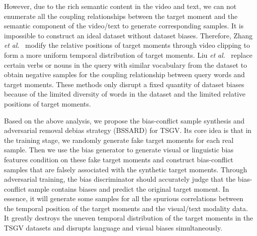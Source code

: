 However, due to the rich semantic content in the video and text, we can not enumerate all the coupling relationships between the target moment and the semantic component of the video/text to generate corresponding samples. It is impossible to construct an ideal dataset without dataset biases. 
Therefore, Zhang {\it et al.}~\cite{RN31} modify the relative positions of target moments through video clipping to form a more uniform temporal distribution of target moments. 
Liu {\it et al.}~\cite{RN28} replace certain verbs or nouns in the query with similar vocabulary from the dataset to obtain negative samples for the coupling relationship between query words and target moments. 
These methods only disrupt a fixed quantity of dataset biases because of the limited diversity of words in the dataset and the limited relative positions of target moments. 

Based on the above analysis, we propose the bias-conflict sample synthesis and adversarial removal debias strategy (BSSARD) for TSGV. 
Its core idea is that in the training stage, we randomly generate fake target moments for each real sample. Then we use the bias generator to generate visual or linguistic bias features condition on these fake target moments and construct bias-conflict samples that are falsely associated with the synthetic target moments. Through adversarial training, the bias discriminator should accurately judge that the bias-conflict sample contains biases and predict the original target moment. 
In essence, it will generate some samples for all the spurious correlations between the temporal position of the target moments and the visual/text modality data. 
It greatly destroys the uneven temporal distribution of the target moments in the TSGV datasets and disrupts language and visual biases simultaneously. 

